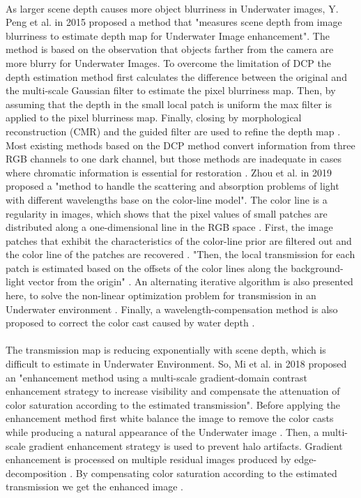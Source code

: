 \documentclass[a4paper,11pt,oneside]{article}
\begin{document}
  \\
  As larger scene depth causes more object blurriness in Underwater images, Y. Peng et al. in 2015 \cite{3} proposed a method that "measures scene depth from image blurriness to estimate depth map for Underwater Image enhancement". The method is based on the observation that objects farther from the camera are more blurry for Underwater Images. To overcome the limitation of DCP the depth estimation method first calculates the difference between the original and the multi-scale Gaussian filter to estimate the pixel blurriness map. Then, by assuming that the depth in the small local patch is uniform the max filter is applied to the pixel blurriness map. Finally, closing by morphological reconstruction (CMR) and the guided filter are used to refine the depth map \cite{3}.\\
   Most existing methods based on the DCP method convert information from three RGB channels to one dark channel, but those methods are inadequate in cases where chromatic information is essential for restoration \cite{17}. Zhou et al. in 2019 \cite{17} proposed a "method to handle the scattering and absorption problems of light with different wavelengths base on the color-line model". The color line is a regularity in images, which shows that the pixel values of small patches are distributed along a  one-dimensional line in the RGB space \cite{17}. First, the image patches that exhibit the characteristics of the color-line prior are filtered out and the color line of the patches are recovered \cite{17}. "Then, the local transmission for each patch is estimated based on the offsets of the color lines along the background-light vector from the origin" \cite{17}. An alternating iterative algorithm is also presented here, to solve the non-linear optimization problem for transmission in an Underwater environment \cite{17}. Finally, a wavelength-compensation method is also proposed to correct the color cast caused by water depth \cite{17}.\\
  \\
  The transmission map is reducing exponentially with scene depth, which is difficult to estimate in Underwater Environment. So, Mi et al. in 2018 \cite{11} proposed an "enhancement method using a multi-scale gradient-domain contrast enhancement strategy to increase visibility and compensate the attenuation of color saturation according to the estimated transmission". Before applying the enhancement method first white balance the image to remove the color casts while producing a natural appearance of the Underwater image \cite{11}. Then, a multi-scale gradient enhancement strategy is used to prevent halo artifacts. Gradient enhancement is processed on multiple residual images produced by edge-decomposition \cite{11}. By compensating color saturation according to the estimated transmission we get the enhanced image \cite{11}.\\ 
\end{document}
